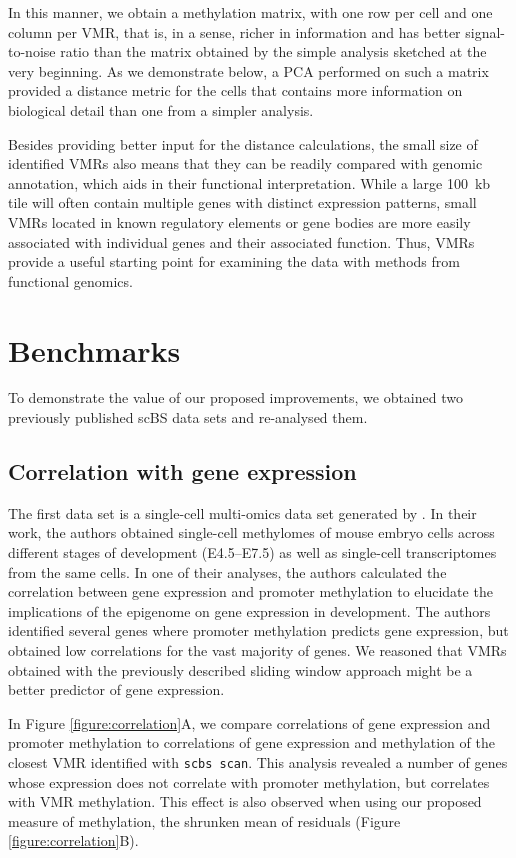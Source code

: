 \documentclass[twocolumn,10pt]{article}
\begin{document}
In this manner, we obtain a methylation matrix, with one row per cell and one column per VMR, that is, in a sense, richer in information and has better signal-to-noise ratio than the matrix obtained by the simple analysis sketched at the very beginning. As we demonstrate below, a PCA performed on such a matrix provided a distance metric for the cells that contains more information on biological detail than one from a simpler analysis. 

Besides providing better input for the distance calculations, the small size of identified VMRs also means that they can be readily compared with genomic annotation, which aids in their functional interpretation.
While a large 100~kb tile will often contain multiple genes with distinct expression patterns, small VMRs located in known regulatory elements or gene bodies are more easily associated with individual genes and their associated function.
Thus, VMRs provide a useful starting point for examining the data with methods from functional genomics.

\section{Benchmarks}

To demonstrate the value of our proposed improvements, we obtained two previously published scBS data sets and re-analysed them.

\subsection{Correlation with gene expression}

The first data set is a single-cell multi-omics data set generated by \citet{argelaguet2019gastru}. In their work, the authors obtained single-cell methylomes of mouse embryo cells across different stages of development (E4.5--E7.5) as well as single-cell transcriptomes from the same cells. In one of their analyses, the authors calculated the correlation between gene expression and promoter methylation to elucidate the implications of the epigenome on gene expression in development. The authors identified several genes where promoter methylation predicts gene expression, but obtained low correlations for the vast majority of genes. We reasoned that VMRs obtained with the previously described sliding window approach might be a better predictor of gene expression. 

In Figure \ref{figure:correlation}A, we compare correlations of gene expression and promoter methylation to correlations of gene expression and methylation of the closest VMR identified with \texttt{scbs scan}.
This analysis revealed a number of genes whose expression does not correlate with promoter methylation, but correlates with VMR methylation.
This effect is also observed when using our proposed measure of methylation, the shrunken mean of residuals (Figure \ref{figure:correlation}B).
\end{document}
